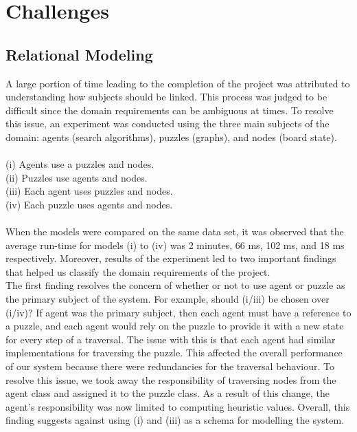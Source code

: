 \section{Challenges}

\subsection{Relational Modeling}

A large portion of time leading to the completion of the project was attributed to understanding how subjects should be linked. This process was judged to be difficult since the domain requirements can be ambiguous at times. To resolve this issue, an experiment was conducted using the three main subjects of the domain: agents (search algorithms), puzzles (graphs), and nodes (board state).
\\
\\

(i) Agents use a puzzles and nodes. 
\\

(ii) Puzzles use agents and nodes.
\\

(iii) Each agent uses puzzles and nodes.
\\

(iv) Each puzzle uses agents and nodes.
\\
\\

When the models were compared on the same data set, it was observed that the average run-time for models (i) to (iv) was 2 minutes, 66 ms, 102 ms, and 18 ms respectively.  Moreover, results of the experiment led to two important findings that helped us classify the domain requirements of the project.\\

The first finding resolves the concern of whether or not to use agent or puzzle as the primary subject of the system. For example, should (i/iii) be chosen over (i/iv)? If agent was the primary subject, then each agent must have a reference to a puzzle, and each agent would rely on the puzzle to provide it with a new state for every step of a traversal. The issue with this is that each agent had similar implementations for traversing the puzzle. This affected the overall performance of our system because there were redundancies for the traversal behaviour. To resolve this issue, we took away the responsibility of traversing nodes from the agent class and assigned it to the puzzle class. As a result of this change, the agent's responsibility was now limited to computing heuristic values. Overall, this finding suggests against using (i) and (iii) as a schema for modelling the system.\\

